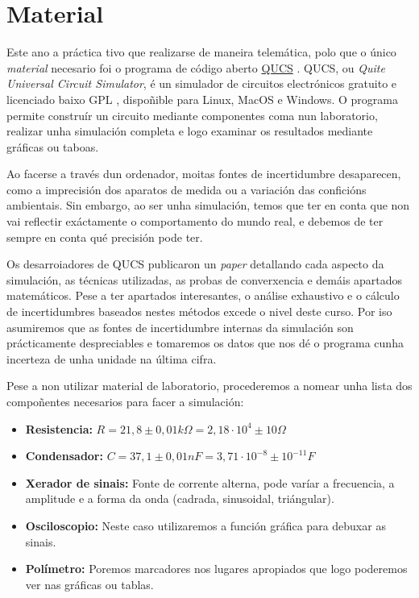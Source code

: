 \documentclass[12pt, a4paper, titlepage]{article}
\begin{document}
    \newpage
    \section{Material}

        Este ano a práctica tivo que realizarse de maneira telemática, polo que o único \textit{material} necesario foi o programa de código aberto \href{http://qucs.sourceforge.net}{QUCS} \cite{qucs}.
        QUCS, ou \textit{Quite Universal Circuit Simulator}, é un simulador de circuitos electrónicos gratuito e licenciado baixo GPL \cite{gplv3}, dispoñible para Linux, MacOS e Windows.
        O programa permite construír un circuito mediante componentes coma nun laboratorio, realizar unha simulación completa e logo examinar os resultados mediante gráficas ou taboas.
        
        Ao facerse a través dun ordenador, moitas fontes de incertidumbre desaparecen, como a imprecisión dos aparatos de medida ou a variación das conficións ambientais.
        Sin embargo, ao ser unha simulación, temos que ter en conta que non vai reflectir exáctamente o comportamento do mundo real, e debemos de ter sempre en conta qué precisión pode ter.
        
        Os desarroiadores de QUCS publicaron un \textit{paper} \cite{qucs_tech} detallando cada aspecto da simulación, as técnicas utilizadas, as probas de converxencia e demáis apartados matemáticos.
        Pese a ter apartados interesantes, o análise exhaustivo e o cálculo de incertidumbres baseados nestes métodos excede o nivel deste curso.
        Por iso asumiremos que as fontes de incertidumbre internas da simulación son prácticamente despreciables e tomaremos os datos que nos dé o programa cunha incerteza de unha unidade na última cifra.

        Pese a non utilizar material de laboratorio, procederemos a nomear unha lista dos compoñentes necesarios para facer a simulación:

        \begin{itemize}
          \item \textbf{Resistencia:} $R = 21,8 \pm 0,01 k\Omega = 2,18 \cdot 10^4 \pm 10 \Omega$
          \item \textbf{Condensador:} $C = 37,1 \pm 0,01 nF = 3,71 \cdot 10^{-8} \pm 10^{-11} F$
          \item \textbf{Xerador de sinais:} Fonte de corrente alterna, pode varíar a frecuencia, a amplitude e a forma da onda (cadrada, sinusoidal, triángular).
          \item \textbf{Osciloscopio:} Neste caso utilizaremos a función gráfica para debuxar as sinais.
          \item \textbf{Polímetro:} Poremos marcadores nos lugares apropiados que logo poderemos ver nas gráficas ou tablas.
        \end{itemize}
\end{document}

